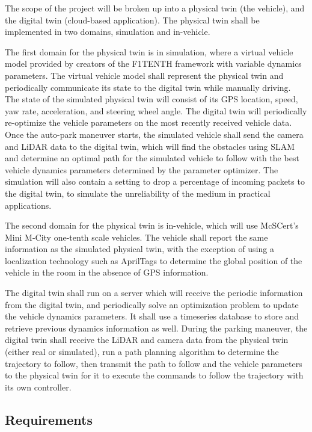 The scope of the project will be broken up into a physical twin (the vehicle), and the digital twin (cloud-based application). The physical twin shall be implemented in two domains, simulation and in-vehicle. 

The first domain for the physical twin is in simulation, where a virtual vehicle model provided by creators of the F1TENTH framework with variable dynamics parameters. The virtual vehicle model shall represent the physical twin and periodically communicate its state to the digital twin while manually driving. The state of the simulated physical twin will consist of its GPS location, speed, yaw rate, acceleration, and steering wheel angle. The digital twin will periodically re-optimize the vehicle parameters on the most recently received vehicle data. Once the auto-park maneuver starts, the simulated vehicle shall send the camera and LiDAR data to the digital twin, which will find the obstacles using SLAM and determine an optimal path for the simulated vehicle to follow with the best vehicle dynamics parameters determined by the parameter optimizer. The simulation will also contain a setting to drop a percentage of incoming packets to the digital twin, to simulate the unreliability of the medium in practical applications.

The second domain for the physical twin is in-vehicle, which will use McSCert's Mini M-City one-tenth scale vehicles. The vehicle shall report the same information as the simulated physical twin, with the exception of using a localization technology such as AprilTags to determine the global position of the vehicle in the room in the absence of GPS information.

The digital twin shall run on a server which will receive the periodic information from the digital twin, and periodically solve an optimization problem to update the vehicle dynamics parameters. It shall use a timeseries database to store and retrieve previous dynamics information as well. During the parking maneuver, the digital twin shall receive the LiDAR and camera data from the physical twin (either real or simulated), run a path planning algorithm to determine the trajectory to follow, then transmit the path to follow and the vehicle parameters to the physical twin for it to execute the commands to follow the trajectory with its own controller.

\subsection{Requirements}

